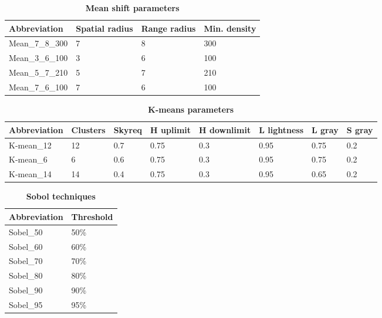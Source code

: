 \documentclass[final,3p,times,authoryear]{elsarticle}
\begin{document}
\begin{table}[!htbp]
\caption{\bf Mean shift parameters \label{tab:techniques2}}     
\begin{tabular}{ l  l  l l}
\textbf{Abbreviation}  & \textbf{Spatial radius}&\textbf{Range radius}&\textbf{Min. density}   \\ \hline
Mean\_7\_8\_300 & 7 & 8& 300 \\
Mean\_3\_6\_100	 & 3& 6& 100 \\
Mean\_5\_7\_210	 & 5& 7& 210 \\	 
Mean\_7\_6\_100	 & 7& 6& 100 \\

\hline
\end{tabular}
\end{table}

\begin{table}[!htbp]
\caption{\bf K-means parameters  \label{tab:techniques3}}     
\begin{tabular}{ l l l l l l l l}
\textbf{Abbreviation} & \textbf{Clusters} & \textbf{Skyreq}&\textbf{H uplimit}&\textbf{H downlimit} & \textbf{L lightness} & \textbf{L gray}& \textbf{S gray} \\ \hline
K-mean\_12  & 12 & 0.7& 0.75& 0.3 & 0.95 & 0.75 & 0.2 \\
K-mean\_6  & 6 & 0.6& 0.75& 0.3 & 0.95 & 0.75 & 0.2 \\
K-mean\_14  & 14 & 0.4& 0.75& 0.3 & 0.95 & 0.65 & 0.2 \\
\hline
\end{tabular}
\end{table}

	

\begin{table}[!htbp]
\caption{\bf Sobol techniques  \label{tab:techniques4}}     
\begin{tabular}{ l  l }
\textbf{Abbreviation}  & \textbf{Threshold}    \\ \hline

Sobel\_50 & 50\% \\	  
Sobel\_60 & 60\% \\	
Sobel\_70 & 70\% \\	
Sobel\_80 & 80\% \\
Sobel\_90 & 90\% \\
Sobel\_95 & 95\% \\
\hline
\end{tabular}
\end{table}
\end{document}
